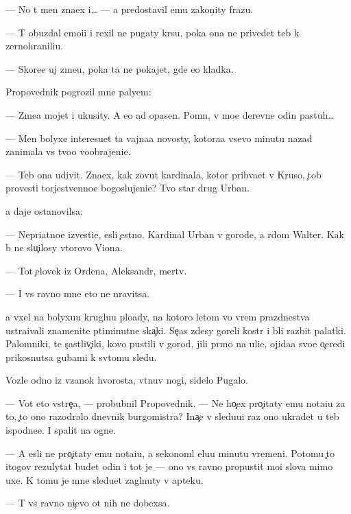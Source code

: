 \documentclass[10pt]{book}
\begin{document}
— No t{\yi} men{\ia} zna{\y}ex i… — {\Y}a predostavil {\y}emu zakon{\c}ity frazu.

— T{\yi} obuzdal emo{\q}i{\y}i i rexil ne pugaty kr{\yi}su, poka ona ne privedet teb{\ia} k zernohranili{\x}u.

— Skore{\y}e uj zme{\y}u, poka ta ne pokajet, gde {\y}e{\y}o kladka.

Propovednik pogrozil mne paly{\q}em:

— Zme{\y}a mojet i ukusity. A {\y}e{\y}o {\y}ad opasen. Pomn{\iu}, v mo{\y}e{\y} derevne odin pastuh…

— Men{\ia} bolyxe interesu{\y}et ta vajna{\y}a novosty, kotora{\y}a vsevo minutu nazad zanimala vs{\e} tvo{\y}o voobrajeni{\y}e.

— Teb{\ia} ona udivit. Zna{\y}ex, kak zovut kardinala, kotor{\yi}{\y} prib{\yi}va{\y}et v Kruso, {\c}tob{\yi} provesti torjestvenno{\y}e bogoslujeni{\y}e? Tvo{\y} star{\yi}{\y} drug Urban.

{\Y}a daje ostanovilsa:

— Nepri{\y}atno{\y}e izvesti{\y}e, {\y}esli {\c}estno. Kardinal Urban v gorode, a r{\ia}dom Walter. Kak b{\yi} ne slu{\c}ilosy vtorovo Viona.

— Tot {\c}elovek iz Ordena, Aleksandr, mertv.

— I vs{\e} ravno mne eto ne nravitsa.

{\Y}a v{\yi}xel na bolyxu{\y}u kruglu{\y}u plo{\x}ady, na kotoro{\y} letom vo vrem{\ia} prazdnestva ustra{\y}ivali znamenit{\yi}{\y}e p{\ia}timinutn{\yi}{\y}e ska{\c}ki. Se{\y}{\c}as zdesy goreli kostr{\yi} i b{\yi}li razbit{\yi} palatki. Palomniki, te s{\c}astliv{\c}iki, kovo pustili v gorod, jili pr{\ia}mo na uli{\q}e, ojida{\y}a svo{\y}e{\y} o{\c}eredi prikosnutsa gubami k sv{\ia}tomu sledu.

Vozle odno{\y} iz v{\ia}zanok hvorosta, v{\yi}t{\ia}nuv nogi, sidelo Pugalo.

— Vot eto vstre{\c}a, — probubnil Propovednik. — Ne ho{\c}ex pro{\c}itaty {\y}emu nota{\q}i{\y}u za to, {\c}to ono razodralo dnevnik burgomistra? Ina{\c}e v sledu{\y}u{\x}i{\y} raz ono ukradet u teb{\ia} ispodne{\y}e. I spalit na ogne.

— A {\y}esli ne pro{\c}itaty {\y}emu nota{\q}i{\y}u, {\y}a sekonoml{\iu} {\q}elu{\y}u minutu vremeni. Potomu {\c}to itogov{\yi}{\y} rezulytat budet odin i tot je — ono vs{\e} ravno propustit mo{\y}i slova mimo uxe{\y}. K tomu je mne sledu{\y}et zagl{\ia}nuty v apteku.

— T{\yi} vs{\e} ravno ni{\c}evo ot nih ne dob{\y}exsa.
\end{document}
